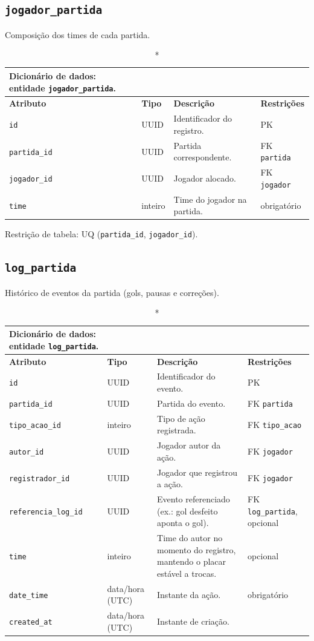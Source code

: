 \begin{apendicesenv}
    \subsection*{\texttt{jogador\_partida}}
    Composição dos times de cada partida.
    \begin{longtable}{p{2.5cm}p{2.1cm}p{5.8cm}p{2.9cm}}
    \caption*{Dicionário de dados: entidade \texttt{jogador\_partida}.}\\
        \hline
        \textbf{Atributo} & \textbf{Tipo} & \textbf{Descrição} & \textbf{Restrições} \\
        \hline
        \endhead
        \texttt{id} & UUID & Identificador do registro. & PK \\
        \texttt{partida\_id} & UUID & Partida correspondente. & FK \texttt{partida} \\
        \texttt{jogador\_id} & UUID & Jogador alocado. & FK \texttt{jogador} \\
        \texttt{time} & inteiro & Time do jogador na partida. & obrigatório \\
        \hline
    \end{longtable}
    \noindent Restrição de tabela: UQ (\texttt{partida\_id}, \texttt{jogador\_id}).

    \subsection*{\texttt{log\_partida}}
    Histórico de eventos da partida (gols, pausas e correções).
    \begin{longtable}{p{2.5cm}p{2.1cm}p{5.8cm}p{2.9cm}}
    \caption*{Dicionário de dados: entidade \texttt{log\_partida}.}\\
        \hline
        \textbf{Atributo} & \textbf{Tipo} & \textbf{Descrição} & \textbf{Restrições} \\
        \hline
        \endhead
        \texttt{id} & UUID & Identificador do evento. & PK \\
        \texttt{partida\_id} & UUID & Partida do evento. & FK \texttt{partida} \\
        \texttt{tipo\_acao\_id} & inteiro & Tipo de ação registrada. & FK \texttt{tipo\_acao} \\
        \texttt{autor\_id} & UUID & Jogador autor da ação. & FK \texttt{jogador} \\
        \texttt{registrador\_id} & UUID & Jogador que registrou a ação. & FK \texttt{jogador} \\
        \texttt{referencia\_log\_id} & UUID & Evento referenciado (ex.: gol desfeito aponta o gol). & FK \texttt{log\_partida}, opcional \\
        \texttt{time} & inteiro & Time do autor no momento do registro, mantendo o placar estável a trocas. & opcional \\
        \texttt{date\_time} & data/hora (UTC) & Instante da ação. & obrigatório \\
        \texttt{created\_at} & data/hora (UTC) & Instante de criação. & \\
        \hline
    \end{longtable}


\end{apendicesenv}
